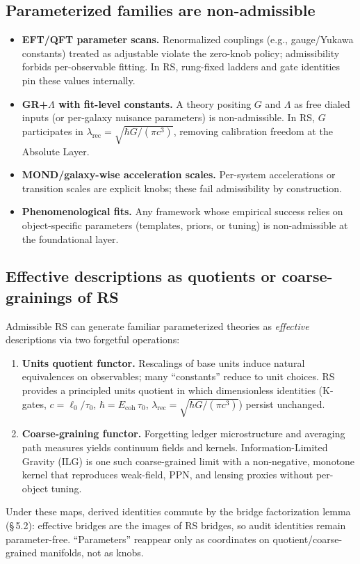 \documentclass[11pt]{article}
\begin{document}
\subsection{Parameterized families are non\mbox{-}admissible}
\begin{itemize}
  \item \textbf{EFT/QFT parameter scans.} Renormalized couplings (e.g., gauge/Yukawa constants) treated as adjustable violate the zero\mbox{-}knob policy; admissibility forbids per\mbox{-}observable fitting. In RS, rung\mbox{-}fixed ladders and gate identities pin these values internally.
  \item \textbf{GR+\(\Lambda\) with fit\mbox{-}level constants.} A theory positing \(G\) and \(\Lambda\) as free dialed inputs (or per\mbox{-}galaxy nuisance parameters) is non\mbox{-}admissible. In RS, \(G\) participates in \(\lambda_{\mathrm{rec}}=\sqrt{\hbar G/(\pi c^3)}\), removing calibration freedom at the Absolute Layer.
  \item \textbf{MOND/galaxy\mbox{-}wise acceleration scales.} Per\mbox{-}system accelerations or transition scales are explicit knobs; these fail admissibility by construction.
  \item \textbf{Phenomenological fits.} Any framework whose empirical success relies on object\mbox{-}specific parameters (templates, priors, or tuning) is non\mbox{-}admissible at the foundational layer.
\end{itemize}

\subsection{Effective descriptions as quotients or coarse\mbox{-}grainings of RS}
Admissible RS can generate familiar parameterized theories as \emph{effective} descriptions via two forgetful operations:
\begin{enumerate}
  \item \textbf{Units quotient functor.} Rescalings of base units induce natural equivalences on observables; many ``constants'' reduce to unit choices. RS provides a principled units quotient in which dimensionless identities (K\mbox{-}gates, \(c=\ell_0/\tau_0\), \(\hbar=E_{\mathrm{coh}}\,\tau_0\), \(\lambda_{\mathrm{rec}}=\sqrt{\hbar G/(\pi c^3)}\)) persist unchanged.
  \item \textbf{Coarse\mbox{-}graining functor.} Forgetting ledger microstructure and averaging path measures yields continuum fields and kernels. Information\mbox{-}Limited Gravity (ILG) is one such coarse\mbox{-}grained limit with a non\mbox{-}negative, monotone kernel that reproduces weak\mbox{-}field, PPN, and lensing proxies without per\mbox{-}object tuning.
\end{enumerate}
Under these maps, derived identities commute by the bridge factorization lemma (\S\,5.2): effective bridges are the images of RS bridges, so audit identities remain parameter\mbox{-}free. ``Parameters'' reappear only as coordinates on quotient/coarse\mbox{-}grained manifolds, not as knobs.
\end{document}
